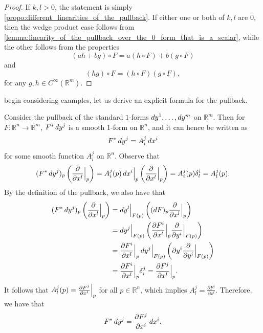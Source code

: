 \documentclass[notoc,notitlepage]{tufte-book}
\begin{document}
\begin{proof}
  If $k, l > 0$, the statement is simply
  \cref{propo:different_linearities_of_the_pullback}. If either one or both of $k, l$ are
  $0$, then the wedge product case follows from
  \cref{lemma:linearity_of_the_pullback_over_the_0_form_that_is_a_scalar}, while the other
  follows from the properties
  \begin{equation*}
    (a h + b g) \circ F = a(h \circ F) + b(g \circ F)
  \end{equation*}
  and
  \begin{equation*}
    (hg) \circ F = (h \circ F)(g \circ F),
  \end{equation*}
  for any $g, h \in C^\infty(\mathbb{R}^m)$.
\end{proof}

 begin considering examples, let us derive an explicit formula for
the pullback.

\begin{note}
  Consider the pullback of the standard $1$-forms $\mathop{}\!d{y^1}, \ldots, \mathop{}\!d{y^m}$ on
  $\mathbb{R}^m$. Then for $F : \mathbb{R}^n \to \mathbb{R}^m$, $F^* \mathop{}\!d{y^j}$ is a smooth
  $1$-form on $\mathbb{R}^n$, and it can hence be written as
  \begin{equation*}
    F^* \mathop{}\!d{y^j} = A_i^j \mathop{}\!d{x^i}
  \end{equation*}
  for some smooth function $A_i^j$ on $\mathbb{R}^n$. Observe that
  \begin{equation*}
    (F^* \mathop{}\!d{y^j})_p \left( \frac{\partial}{\partial x^l} \Big|_{p}^{} \right)
    = A_i^j (p) \mathop{}\!d{x^i} \Big|_{p}^{} \left( \frac{\partial}{\partial x^l} \Big|_{p}^{} \right)
    = A_i^j(p) \delta_l^i = A_l^j(p).
  \end{equation*}
  By the definition of the pullback, we also have that
  \begin{align*}
    (F^* \mathop{}\!d{y^j})_p \left( \frac{\partial}{\partial x^l} \Big|_{p}^{} \right)
    &= \mathop{}\!d{y^l} \Big|_{F(p)}^{} \left( (\mathop{}\!d{F})_p \frac{\partial}{\partial x^l} \Big|_{p}^{}
      \right) \\
    &= \mathop{}\!d{y^j} \Big|_{F(p)}^{} \left( \frac{\partial F^i}{\partial x^l}\Big|_{p}^{}
      \frac{\partial}{\partial y^i} \Big|_{F(p)}^{} \right) \\
    &= \frac{\partial F^i}{\partial x^l} \Big|_{p}^{} \mathop{}\!d{y^j} \Big|_{F(p)}^{} \left(\partial y^i
      \frac{\partial}{\partial y^i} \Big|_{F(p)}^{} \right) \\
    &= \frac{\partial F^i}{\partial x^l} \Big|_{p}^{} \delta_i^j = \frac{\partial F^j}{\partial
      x^l} \Big|_{p}^{}.
  \end{align*}
  It follows that $A_l^j(p) = \frac{\partial F^j}{\partial x^l} \Big|_{p}^{}$ for all $p \in
  \mathbb{R}^n$, which implies $A_l^j = \frac{\partial F^j}{\partial x^l}$. Therefore, we
  have that
  \begin{equation}\label{eq:explicit_formula_of_standard_1_forms}
    F^* \mathop{}\!d{y^j} = \frac{\partial F^j}{\partial x^i} \mathop{}\!d{x^i}.
  \end{equation}
\end{note}
\end{document}
